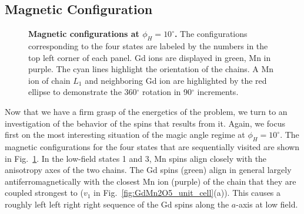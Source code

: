 \subsection{Magnetic Configuration}
\begin{figure}[h!]
    \centering
    \caption{\label{fig:GdMn2O5_spin_configs}{\bf Magnetic configurations at $\phi_H =  10^\circ$.} The configurations corresponding to the four states are labeled by the numbers in the top left corner of each panel. Gd ions are displayed in green, Mn in purple. The cyan lines highlight the orientation of the chains. A Mn ion of chain $L_1$ and neighboring Gd ion are highlighted by the red ellipse to demonstrate the 360$^\circ$ rotation in 90$^\circ$ increments.  }
    \label{fig:GdMn2O5_4configs}
\end{figure}
Now that we have a firm grasp of the energetics of the problem, we turn to an investigation of the behavior of the spins that results from it.
Again, we focus first on the most interesting situation of the magic angle regime at $\phi_H=10^\circ$.
The magnetic configurations for the four states that are sequentially visited are shown in Fig.~\ref{fig:GdMn2O5_4configs}.
In the low-field states 1 and 3, Mn spins align closely with the anisotropy axes of the two chains.
The Gd spins (green) align in general largely antiferromagnetically with the closest Mn ion (purple) of the chain that they are coupled strongest to ($v_1$ in Fig.~\ref{fig:GdMn2O5_unit_cell}(a)).
This causes a roughly left left right right sequence of the Gd spins along the $a$-axis at low field. 

